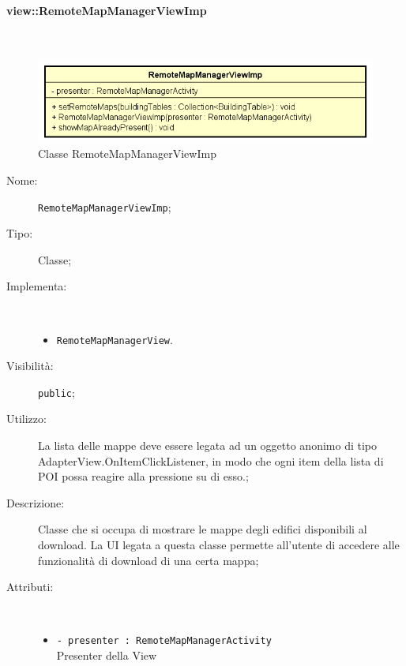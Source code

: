 \documentclass[../DefinizioneDiProdotto.tex]{subfiles}
\begin{document}
\paragraph{view::RemoteMapManagerViewImp}
\
\begin{figure}[H]
	\centering
	\includegraphics[width=\maxwidth]{img/RemoteMapManagerViewImp.png}
	\caption{Classe RemoteMapManagerViewImp}\label{fig:view::RemoteMapManagerViewImp} 
\end{figure}
\begin{description}
	\item[Nome:] \texttt{RemoteMapManagerViewImp};
	\item[Tipo:] Classe;
	\item[Implementa:] \
	\begin{itemize}
		\item \texttt{RemoteMapManagerView}.
		
	\end{itemize}
	\item[Visibilità:] \texttt{public};
	\item[Utilizzo:] La lista delle mappe deve essere legata ad un oggetto anonimo di tipo AdapterView.OnItemClickListener, in modo che ogni item della lista di POI possa reagire alla pressione su di esso.;
	\item[Descrizione:] Classe che si occupa di mostrare le mappe degli edifici disponibili al download. La UI legata a questa classe permette all'utente di accedere alle funzionalità di download di una certa mappa;
	\item[Attributi:] \
	\begin{itemize}
		\item \texttt{- presenter : RemoteMapManagerActivity}\\
		Presenter della View
		

\end{itemize}
\end{description}
\end{document}
